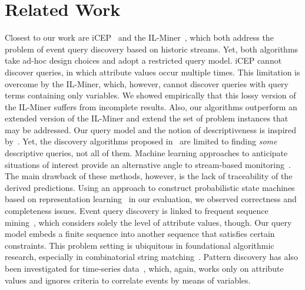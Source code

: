 \section{Related Work}
\label{sec:related_work}
Closest to our work are iCEP~\cite{icep} and the IL-Miner~\cite{ilminer},
which both address the problem of event query discovery based on historic
streams. Yet, both
algorithms take ad-hoc design choices and adopt a restricted query model.
iCEP cannot discover queries, in which attribute values
occur multiple times. This limitation is overcome by the IL-Miner, which,
however, cannot discover queries with query terms containing only
variables. We showed empirically that this lossy version of the IL-Miner
suffers from incomplete results. Also, our algorithms outperform an extended
version of the IL-Miner and extend the set of problem
instances that may be addressed.
Our query model and the notion of descriptiveness is inspired
by~\cite{icdt2022,DBLP:conf/btw/Kleest-Meissner23}. Yet, the discovery
algorithms proposed in~\cite{icdt2022,DBLP:conf/btw/Kleest-Meissner23} are
limited to finding
\emph{some} descriptive queries, not all of them.
Machine learning approaches to anticipate situations of
interest provide an alternative angle to stream-based
monitoring~\cite{yanli2021,ARECEP,autoCEP}. The main drawback of these
methods,
however, is the lack of traceability of the derived
predictions. Using an approach to construct probabilistic state
machines based on representation learning~\cite{yanli2021} in our
evaluation, we observed correctness and completeness issues.
Event query discovery is linked to frequent sequence
mining~\cite{agrawal1995,clospan,bide}, which considers solely
the level of attribute values, though. Our query model embeds a finite
sequence into
another sequence that satisfies certain
constraints. This problem setting is ubiquitous in foundational algorithmic
research, especially in combinatorial string
matching~\cite{DayEtAl2022,KoscheEtAl2022}.
Pattern discovery has also been investigated for
time-series data~\cite{streaming,crossmatch}, which, again, works only  on
attribute values and ignores criteria to correlate events by means of
variables.